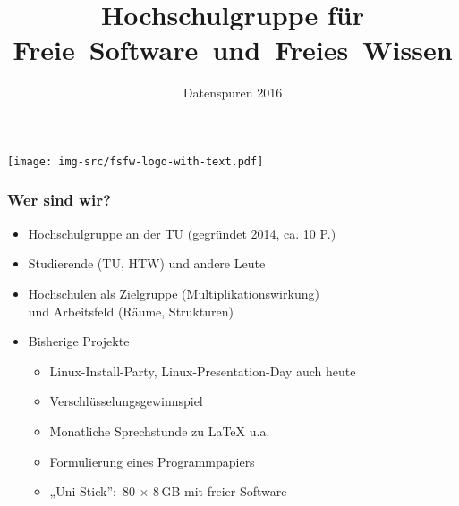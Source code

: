 \documentclass{beamer}
\title{Hochschulgruppe für Freie~Software~und~Freies~Wissen}
\subtitle{Datenspuren 2016}
\begin{document}
\begin{frame}
  \begin{center}%
    \texttt{[image: img-src/fsfw-logo-with-text.pdf]}\\

    \vspace*{-0.5\baselineskip}

    \parbox{6cm}{\centering\inserttitle}

    \vspace*{\baselineskip}

    \structure{\Large \insertsubtitle}
  \end{center}
\end{frame}

\begin{frame}[label=ct1]
  \frametitle{Wer sind wir?}

  \onslide<+->

  \begin{itemize}
  \item Hochschulgruppe an der TU (gegründet 2014, ca. 10 P.)
  \item Studierende (TU, HTW) und andere Leute
  \item Hochschulen als Zielgruppe (Multiplikationswirkung)\\
    und Arbeitsfeld (Räume, Strukturen)

    \bigskip\onslide<+->

  \item Bisherige Projekte
    \begin{itemize}
    \item Linux-Install-Party, Linux-Presentation-Day {\tiny auch heute}
    \item Verschlüsselungsgewinnspiel
    \item Monatliche Sprechstunde zu \LaTeX{} u.a.
    \item Formulierung eines Programmpapiers
    \item „Uni-Stick”:~80 $\times$ 8\,GB mit freier Software
    \end{itemize}
  \end{itemize}
\end{frame}
\end{document}
